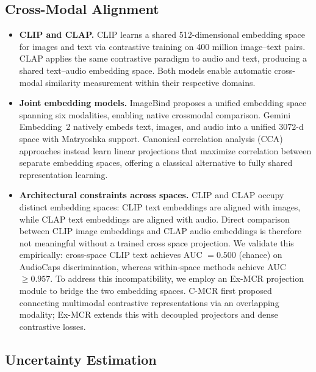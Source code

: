 \documentclass[a4paper,fleqn]{cas-sc}
\begin{document}
\subsection{Cross-Modal Alignment}\label{sec:cross-modal-alignment}

\begin{itemize}

\item \textbf{CLIP and CLAP.}
CLIP \citep{radford2021learning} learns a shared 512-dimensional embedding space for images and text via contrastive training on 400 million image--text pairs. CLAP \citep{wu2023large} applies the same contrastive paradigm to audio and text, producing a shared text--audio embedding space. Both models enable automatic cross-modal similarity measurement within their respective domains.

\item \textbf{Joint embedding models.}
ImageBind \citep{girdhar2023imagebind} proposes a unified embedding space spanning six modalities, enabling native crossmodal comparison. Gemini Embedding~2 \citep{google2026gemini} natively embeds text, images, and audio into a unified 3072-d space with Matryoshka support. Canonical correlation analysis (CCA) approaches \citep{andrew2013deep,hardoon2004canonical} instead learn linear projections that maximize correlation between separate embedding spaces, offering a classical alternative to fully shared representation learning.

\item \textbf{Architectural constraints across spaces.}
CLIP and CLAP occupy distinct embedding spaces: CLIP text embeddings are aligned with images, while CLAP text embeddings are aligned with audio. Direct comparison between CLIP image embeddings and CLAP audio embeddings is therefore not meaningful without a trained cross space projection. We validate this empirically: cross-space CLIP text achieves AUC $= 0.500$ (chance) on AudioCaps discrimination, whereas within-space methods achieve AUC $\geq 0.957$. To address this incompatibility, we employ an Ex-MCR projection module \citep{wang2024exmcr} to bridge the two embedding spaces. C-MCR \citep{wang2023cmcr} first proposed connecting multimodal contrastive representations via an overlapping modality; Ex-MCR extends this with decoupled projectors and dense contrastive losses.

\end{itemize}

\subsection{Uncertainty Estimation}\label{sec:uncertainty-estimation}
\end{document}
